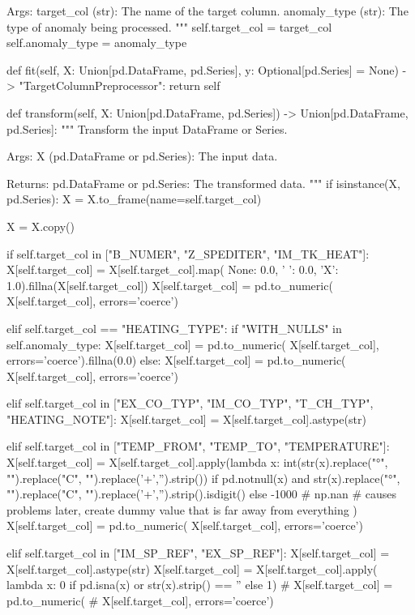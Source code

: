{{        Args:
            target_col (str): The name of the target column.
            anomaly_type (str): The type of anomaly being processed.
        """
        self.target_col = target_col
        self.anomaly_type = anomaly_type

    def fit(self, X: Union[pd.DataFrame, pd.Series], y: Optional[pd.Series] = None) -> "TargetColumnPreprocessor":
        return self

    def transform(self, X: Union[pd.DataFrame, pd.Series]) -> Union[pd.DataFrame, pd.Series]:
        """
        Transform the input DataFrame or Series.

        Args:
            X (pd.DataFrame or pd.Series): The input data.

        Returns:
            pd.DataFrame or pd.Series: The transformed data.
        """
        if isinstance(X, pd.Series):
            X = X.to_frame(name=self.target_col)

        X = X.copy()

        if self.target_col in ["B_NUMER", "Z_SPEDITER", "IM_TK_HEAT"]:
            X[self.target_col] = X[self.target_col].map(
                {None: 0.0, ' ': 0.0, 'X': 1.0}).fillna(X[self.target_col])
            X[self.target_col] = pd.to_numeric(
                X[self.target_col], errors='coerce')

        elif self.target_col == "HEATING_TYPE":
            if "WITH_NULLS" in self.anomaly_type:
                X[self.target_col] = pd.to_numeric(
                    X[self.target_col], errors='coerce').fillna(0.0)
            else:
                X[self.target_col] = pd.to_numeric(
                    X[self.target_col], errors='coerce')

        elif self.target_col in ["EX_CO_TYP", "IM_CO_TYP", "T_CH_TYP", "HEATING_NOTE"]:
            X[self.target_col] = X[self.target_col].astype(str)

        elif self.target_col in ["TEMP_FROM", "TEMP_TO", "TEMPERATURE"]:
            X[self.target_col] = X[self.target_col].apply(lambda x: int(str(x).replace("°", "").replace("C", "").replace('+','').strip()) 
                    if pd.notnull(x) and str(x).replace("°", "").replace("C", "").replace('+','').strip().isdigit() 
                    else -1000 # np.nan # causes problems later, create dummy value that is far away from everything
                    )
            X[self.target_col] = pd.to_numeric(
                X[self.target_col], errors='coerce')

        elif self.target_col in ["IM_SP_REF", "EX_SP_REF"]:
            X[self.target_col] = X[self.target_col].astype(str)
            X[self.target_col] = X[self.target_col].apply(
                lambda x: 0 if pd.isna(x) or str(x).strip() == '' else 1)
            # X[self.target_col] = pd.to_numeric(
            #     X[self.target_col], errors='coerce')

}}
